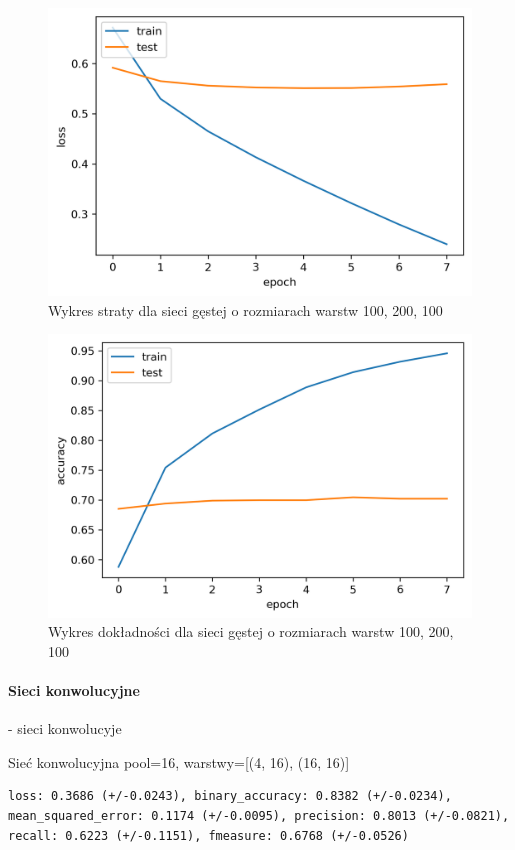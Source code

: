 \documentclass[polish,12pt]{aghthesis}
\begin{document}
\begin{figure}[H]
	\centering
	\includegraphics[width=0.7\linewidth]{dense_100_200_100_loss.png}
	\caption{Wykres straty dla sieci gęstej o rozmiarach warstw 100, 200, 100}
	\label{fig:dense_100_200_100_loss}
\end{figure}
\begin{figure}[H]
	\centering
	\includegraphics[width=0.7\linewidth]{dense_100_200_100_acc.png}
	\caption{Wykres dokładności dla sieci gęstej o rozmiarach warstw 100, 200, 100}
	\label{fig:dense_100_200_100_acc}
\end{figure}

\paragraph{Sieci konwolucyjne} - sieci konwolucyje %

Sieć konwolucyjna pool=16, warstwy=[(4, 16), (16, 16)]

\begin{lstlisting}[float=h!, style=result, caption={Wyniki sieci konwolucyjnej}]
loss: 0.3686 (+/-0.0243), binary_accuracy: 0.8382 (+/-0.0234), mean_squared_error: 0.1174 (+/-0.0095), precision: 0.8013 (+/-0.0821), recall: 0.6223 (+/-0.1151), fmeasure: 0.6768 (+/-0.0526)
\end{lstlisting}
\end{document}
